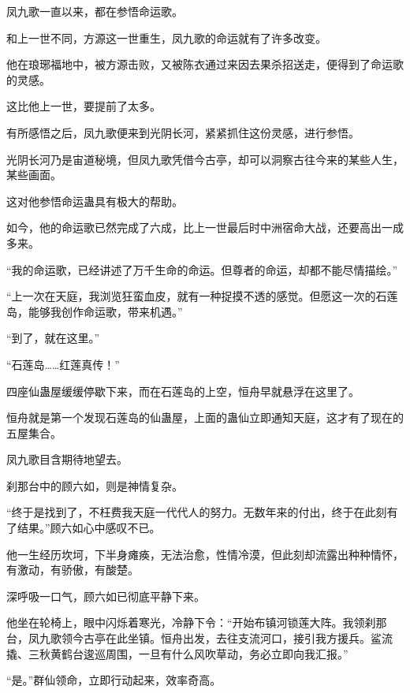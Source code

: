 \begin{this_body}
凤九歌一直以来，都在参悟命运歌。

和上一世不同，方源这一世重生，凤九歌的命运就有了许多改变。

他在琅琊福地中，被方源击败，又被陈衣通过来因去果杀招送走，便得到了命运歌的灵感。

这比他上一世，要提前了太多。

有所感悟之后，凤九歌便来到光阴长河，紧紧抓住这份灵感，进行参悟。

光阴长河乃是宙道秘境，但凤九歌凭借今古亭，却可以洞察古往今来的某些人生，某些画面。

这对他参悟命运蛊具有极大的帮助。

如今，他的命运歌已然完成了六成，比上一世最后时中洲宿命大战，还要高出一成多来。

“我的命运歌，已经讲述了万千生命的命运。但尊者的命运，却都不能尽情描绘。”

“上一次在天庭，我浏览狂蛮血皮，就有一种捉摸不透的感觉。但愿这一次的石莲岛，能够我创作命运歌，带来机遇。”

“到了，就在这里。”

“石莲岛……红莲真传！”

四座仙蛊屋缓缓停歇下来，而在石莲岛的上空，恒舟早就悬浮在这里了。

恒舟就是第一个发现石莲岛的仙蛊屋，上面的蛊仙立即通知天庭，这才有了现在的五屋集合。

凤九歌目含期待地望去。

刹那台中的顾六如，则是神情复杂。

“终于是找到了，不枉费我天庭一代代人的努力。无数年来的付出，终于在此刻有了结果。”顾六如心中感叹不已。

他一生经历坎坷，下半身瘫痪，无法治愈，性情冷漠，但此刻却流露出种种情怀，有激动，有骄傲，有酸楚。

深呼吸一口气，顾六如已彻底平静下来。

他坐在轮椅上，眼中闪烁着寒光，冷静下令：“开始布镇河锁莲大阵。我领刹那台，凤九歌领今古亭在此坐镇。恒舟出发，去往支流河口，接引我方援兵。鲨流撬、三秋黄鹤台逡巡周围，一旦有什么风吹草动，务必立即向我汇报。”

“是。”群仙领命，立即行动起来，效率奇高。

\end{this_body}

